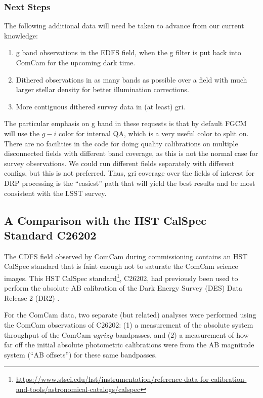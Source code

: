 \subsubsection{Next Steps}

The following additional data will need be taken to advance from our current
knowledge:

\begin{enumerate}
  \item{g band observations in the EDFS field, when the g filter is put back
    into ComCam for the upcoming dark time.}
  \item{Dithered observations in as many bands as possible over a field with
    much larger stellar density for better illumination corrections.}
  \item{More contiguous dithered survey data in (at least) gri.}
\end{enumerate}

The particular emphasis on g band in these requests is that by default FGCM
will use the $g-i$ color for internal QA, which is a very useful color to split
on.  There are no facilities in the code for doing quality calibrations on
multiple disconnected fields with different band coverage, as this is not the
normal case for survey observations.  We could run different fields separately
with different configs, but this is not preferred.  Thus, gri coverage over the
fields of interest for DRP processing is the ``easiest'' path that will yield
the best results and be most consistent with the LSST survey.


\subsection{A Comparison with the HST CalSpec Standard C26202}
\label{sec:C26202}

The CDFS field observed by ComCam during commissioning contains an HST
CalSpec standard that is faint enough not to saturate the ComCam
science images.  This HST CalSpec
standard\footnote{\url{https://www.stsci.edu/hst/instrumentation/reference-data-for-calibration-and-tools/astronomical-catalogs/calspec}},
C26202, had previously been used to perform the absolute AB
calibration of the Dark Energy Survey (DES) Data Release 2 (DR2)
\citep{2021ApJS..255...20A}.

For the ComCam data, two separate (but related) analyses were
performed using the ComCam observations of C26202: (1) a measurement
of the absolute system throughput of the ComCam $ugrizy$ bandpasses,
and (2) a measurement of how far off the initial absolute photometric
calibrations were from the AB magnitude system (``AB offsets'') for
these same bandpasses.

